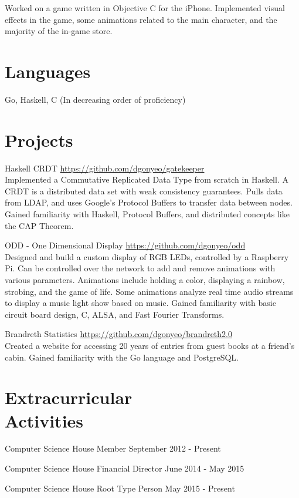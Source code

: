 \documentclass[letterpaper,margin,line,11pt]{resume}
\newcommand{\rurl}[1]{\hfill {\footnotesize \url{#1}}}
\begin{document}
\begin{resume}
\begin{asparadesc}
        \small
        Worked on a game written in Objective C for the iPhone. Implemented visual effects in the game, some animations related to the main character, and the majority of the in-game store.
        \normalsize
    \end{asparadesc}

\section{\mysidestyle Languages}
    Go, Haskell, C
    \hfill 
    \footnotesize 
    (In decreasing order of proficiency)
    \normalsize

\section{\mysidestyle Projects}
    \begin{compactdesc}
        \item[Haskell CRDT] \rurl{https://github.com/dgonyeo/gatekeeper} \\
            Implemented a Commutative Replicated Data Type from scratch in Haskell. A CRDT is a distributed data set with weak consistency guarantees. Pulls data from LDAP, and uses Google's Protocol Buffers to transfer data between nodes. Gained familiarity with Haskell, Protocol Buffers, and distributed concepts like the CAP Theorem.
        \item[ODD - One Dimensional Display] \rurl{https://github.com/dgonyeo/odd} \\
            Designed and build a custom display of RGB LEDs, controlled by a Raspberry Pi. Can be controlled over the network to add and remove animations with various parameters. Animations include holding a color, displaying a rainbow, strobing, and the game of life. Some animations analyze real time audio streams to display a music light show based on music. Gained familiarity with basic circuit board design, C, ALSA, and Fast Fourier Transforms.
        \item[Brandreth Statistics] \rurl{https://github.com/dgonyeo/brandreth2.0} \\
            Created a website for accessing 20 years of entries from guest books at a friend's cabin. Gained familiarity with the Go language and PostgreSQL.
    \end{compactdesc}

\section{\mysidestyle Extracurricular \\ Activities}
    \begin{asparablank}
        \item Computer Science House Member \hfill September 2012 - Present
        \item Computer Science House Financial Director \hfill June 2014 - May 2015
        \item Computer Science House Root Type Person \hfill May 2015 - Present
    \end{asparablank}

\end{resume}
\end{document}
